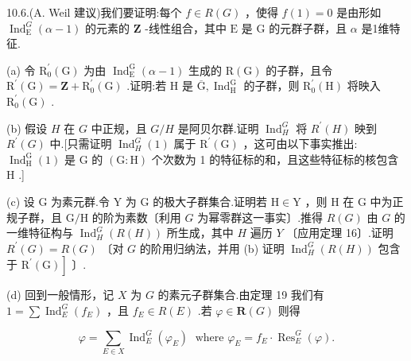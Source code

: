 \documentclass[10pt]{article}
\begin{document}
10.6.(A. Weil 建议)我们要证明:每个 \(f \in  R\left( G\right)\) ，使得 \(f\left( 1\right)  = 0\) 是由形如 \({\operatorname{Ind}}_{\mathrm{E}}^{G}\left( {\alpha  - 1}\right)\) 的元素的 \(\mathbf{Z}\) -线性组合，其中 \(\mathrm{E}\) 是 \(\mathrm{G}\) 的元群子群，且 \(\alpha\) 是1维特征.

(a) 令 \({\mathrm{R}}_{0}^{\prime }\left( \mathrm{G}\right)\) 为由 \({\operatorname{Ind}}_{\mathrm{E}}^{\mathrm{G}}\left( {\alpha  - 1}\right)\) 生成的 \(\mathrm{R}\left( \mathrm{G}\right)\) 的子群，且令 \({\mathrm{R}}^{\prime }\left( \mathrm{G}\right)  = \mathbf{Z} + {\mathrm{R}}_{0}^{\prime }\left( \mathrm{G}\right)\) .证明:若 \(\mathrm{H}\) 是 \(\overline{\mathrm{G}},{\operatorname{Ind}}_{\mathrm{H}}^{\mathrm{G}}\) 的子群，则 \({\mathrm{R}}_{0}^{\prime }\left( \mathrm{H}\right)\) 将映入 \({\mathrm{R}}_{0}^{\prime }\left( \mathrm{G}\right)\) .

(b) 假设 \(H\) 在 \(G\) 中正规，且 \(G/H\) 是阿贝尔群.证明 \({\operatorname{Ind}}_{H}^{G}\) 将 \({R}^{\prime }\left( H\right)\) 映到 \({R}^{\prime }\left( G\right)\) 中.[只需证明 \({\operatorname{Ind}}_{H}^{G}\left( 1\right)\) 属于 \({\mathrm{R}}^{\prime }\left( \mathrm{G}\right)\) ，这可由以下事实推出: \({\operatorname{Ind}}_{\mathrm{H}}^{\mathrm{G}}\left( 1\right)\) 是 \(\mathrm{G}\) 的 \(\left( {\mathrm{G} : \mathrm{H}}\right)\) 个次数为 1 的特征标的和，且这些特征标的核包含 \(\mathrm{H}\) .]

(c) 设 \(\mathrm{G}\) 为素元群.令 \(\mathrm{Y}\) 为 \(\mathrm{G}\) 的极大子群集合.证明若 \(\mathrm{H} \in  \mathrm{Y}\) ，则 \(\mathrm{H}\) 在 \(\mathrm{G}\) 中为正规子群，且 \(\mathrm{G}/\mathrm{H}\) 的阶为素数〔利用 \(G\) 为幂零群这一事实〕.推得 \(R\left( G\right)\) 由 \(G\) 的一维特征构与 \({\operatorname{Ind}}_{H}^{G}\left( {R\left( H\right) }\right)\) 所生成，其中 \(H\) 遍历 \(Y\) 〔应用定理 16〕.证明 \({R}^{\prime }\left( G\right)  = R\left( G\right)\) 〔对 \(G\) 的阶用归纳法，并用 (b) 证明 \({\operatorname{Ind}}_{H}^{G}\left( {R\left( H\right) }\right)\) 包含于 \(\left. {{\mathrm{R}}^{\prime }\left( \mathrm{G}\right) }\right\rbrack\) 〕.

(d) 回到一般情形，记 \(X\) 为 \(G\) 的素元子群集合.由定理 19 我们有 \(1 = \sum {\operatorname{Ind}}_{E}^{G}\left( {f}_{E}\right)\) ，且 \({f}_{E} \in  R\left( E\right)\) .若 \(\varphi  \in  \mathbf{R}\left( G\right)\) 则得

\[
\varphi  = \mathop{\sum }\limits_{{E \in  X}}{\operatorname{Ind}}_{E}^{G}\left( {\varphi }_{E}\right) \;\text{ where }{\varphi }_{E} = {f}_{E} \cdot  {\operatorname{Res}}_{E}^{G}\left( \varphi \right) .
\]
\end{document}
